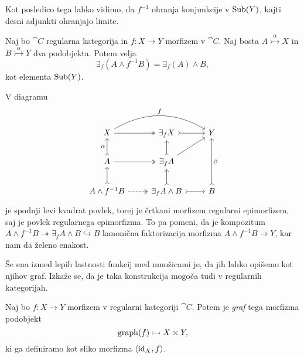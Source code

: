 \documentclass[../kategoricna_logika.tex]{subfiles}
\begin{document}
\noindent
Kot posledico tega lahko vidimo, da $f^{-1}$ ohranja konjunkcije v $\operatorname{Sub}(Y)$, kajti desni adjunkti ohranjajo limite.
\begin{lema}
  Naj bo $\cat{C}$ regularna kategorija in $f : X \to Y$ morfizem v $\cat{C}$.
  Naj bosta $A \overset{\alpha}{\rightarrowtail} X$ in $B \overset{\alpha}{\rightarrowtail} Y$ dva podobjekta.
  Potem velja
  $$\exists_f(A \wedge f^{-1}B) = \exists_f(A) \wedge B,$$
  kot elementa $\operatorname{Sub}(Y)$.
\end{lema}
\begin{dokaz}
  V diagramu
  \begin{equation*}
  \begin{tikzcd}
    X \ar[rr, bend left, "f"] \ar[r, two heads] & \exists_f X \ar[r, tail] & Y \\
    A \ar[u, tail, "\alpha"] \ar[r, two heads] & \exists_f A \ar[u, tail] \ar[ur] & \\
    A \land f^{-1}B \ar[u, tail] \ar[r, dashed, two heads] & \exists_f A \land B \ar[r, tail] \ar[u, tail] & B \ar[uu, tail, "\beta"']
  \end{tikzcd}
  \end{equation*}
  je spodnji levi kvadrat povlek, torej je črtkani morfizem regularni epimorfizem, saj je povlek regularnega epimorfizma.
  To pa pomeni, da je kompozitum 
  $A \land f^{-1}B \twoheadrightarrow \exists_f A \land B \hookrightarrow B$
  kanonična faktorizacija morfizma $A \land f^{-1}B \to Y$, kar nam da želeno enakost.
\end{dokaz}

Še ena izmed lepih lastnosti funkcij med množicami je, da jih lahko opišemo kot njihov graf. Izkaže se, da je taka konstrukcija mogoča tudi v regularnih kategorijah.
\begin{definicija}
  Naj bo $f : X \to Y$ morfizem v regularni kategoriji $\cat{C}$. Potem je \emph{graf} tega morfizma podobjekt
  $$\operatorname{graph}(f) \rightarrowtail X \times Y,$$
  ki ga definiramo kot sliko morfizma $\langle \mathrm{id}_X, f \rangle$.
\end{definicija}
\end{document}
